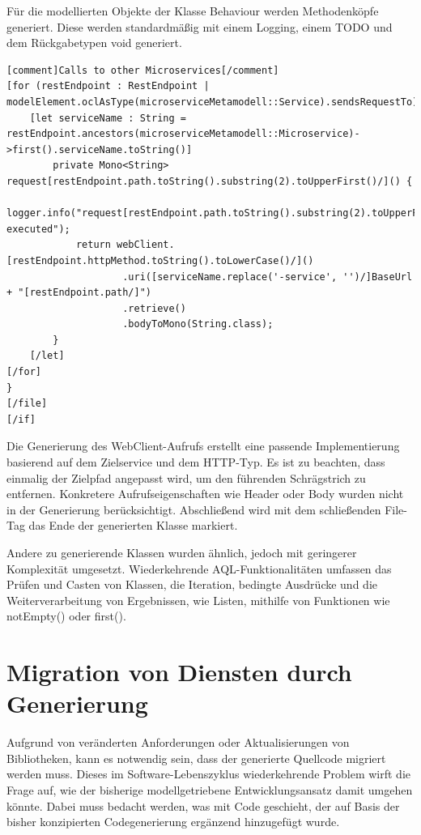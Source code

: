 \newpage

Für die modellierten Objekte der Klasse Behaviour werden Methodenköpfe generiert. Diese werden standardmäßig mit einem Logging, einem \glqq TODO\grqq{} und dem Rückgabetypen \glqq void\grqq{} generiert.

\begin{lstlisting}[caption=WebClient Implementierung]
[comment]Calls to other Microservices[/comment]
[for (restEndpoint : RestEndpoint | modelElement.oclAsType(microserviceMetamodell::Service).sendsRequestTo)]
    [let serviceName : String = restEndpoint.ancestors(microserviceMetamodell::Microservice)->first().serviceName.toString()]
        private Mono<String> request[restEndpoint.path.toString().substring(2).toUpperFirst()/]() {
            logger.info("request[restEndpoint.path.toString().substring(2).toUpperFirst()/] executed");
            return webClient.[restEndpoint.httpMethod.toString().toLowerCase()/]()
                    .uri([serviceName.replace('-service', '')/]BaseUrl + "[restEndpoint.path/]")
					.retrieve()
					.bodyToMono(String.class);
		}
	[/let]
[/for]
}
[/file]
[/if]
\end{lstlisting}

Die Generierung des WebClient-Aufrufs erstellt eine passende Implementierung basierend auf dem Zielservice und dem HTTP-Typ. Es ist zu beachten, dass einmalig der Zielpfad angepasst wird, um den führenden Schrägstrich zu entfernen. Konkretere Aufrufseigenschaften wie Header oder Body wurden nicht in der Generierung berücksichtigt. Abschließend wird mit dem schließenden File-Tag das Ende der generierten Klasse markiert.

Andere zu generierende Klassen wurden ähnlich, jedoch mit geringerer Komplexität umgesetzt. Wiederkehrende AQL-Funktionalitäten umfassen das Prüfen und Casten von Klassen, die Iteration, bedingte Ausdrücke und die Weiterverarbeitung von Ergebnissen, wie Listen, mithilfe von Funktionen wie \glqq{}notEmpty()\grqq{} oder \glqq first()\grqq{}.

\newpage

\section{Migration von Diensten durch Generierung}

Aufgrund von veränderten Anforderungen oder Aktualisierungen von Bibliotheken, kann es notwendig sein, dass der generierte Quellcode migriert werden muss. Dieses im Software-Lebenszyklus wiederkehrende Problem wirft die Frage auf, wie der bisherige modellgetriebene Entwicklungsansatz damit umgehen könnte. Dabei muss bedacht werden, was mit Code geschieht, der auf Basis der bisher konzipierten Codegenerierung ergänzend hinzugefügt wurde.

